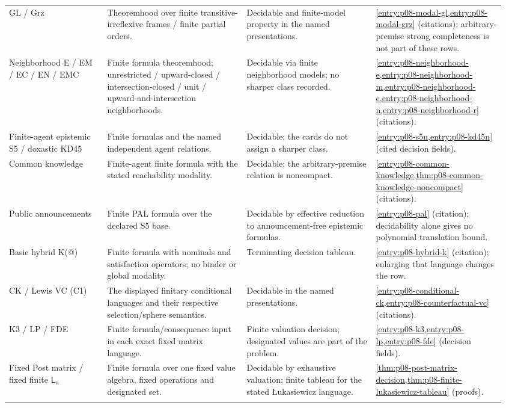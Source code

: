 \begin{landscape}
\begin{longtable}{@{}p{0.19\linewidth}p{0.27\linewidth}p{0.25\linewidth}p{0.25\linewidth}@{}}
GL / Grz & Theoremhood over finite transitive-irreflexive frames / finite partial orders. & Decidable and finite-model property in the named presentations. & \cref{entry:p08-modal-gl,entry:p08-modal-grz} (citations); arbitrary-premise strong completeness is not part of these rows.\\\addlinespace
Neighborhood E / EM / EC / EN / EMC & Finite formula theoremhood; unrestricted / upward-closed / intersection-closed / unit / upward-and-intersection neighborhoods. & Decidable via finite neighborhood models; no sharper class recorded. & \cref{entry:p08-neighborhood-e,entry:p08-neighborhood-m,entry:p08-neighborhood-c,entry:p08-neighborhood-n,entry:p08-neighborhood-r} (citations).\\\addlinespace
Finite-agent epistemic S5 / doxastic KD45 & Finite formulas and the named independent agent relations. & Decidable; the cards do not assign a sharper class. & \cref{entry:p08-s5n,entry:p08-kd45n} (cited decision fields).\\\addlinespace
Common knowledge & Finite-agent finite formula with the stated reachability modality. & Decidable; the arbitrary-premise relation is noncompact. & \cref{entry:p08-common-knowledge,thm:p08-common-knowledge-noncompact} (citations).\\\addlinespace
Public announcements & Finite PAL formula over the declared S5 base. & Decidable by effective reduction to announcement-free epistemic formulas. & \cref{entry:p08-pal} (citation); decidability alone gives no polynomial translation bound.\\\addlinespace
Basic hybrid K(@) & Finite formula with nominals and satisfaction operators; no binder or global modality. & Terminating decision tableau. & \cref{entry:p08-hybrid-k} (citation); enlarging that language changes the row.\\\addlinespace
CK / Lewis VC (C1) & The displayed finitary conditional languages and their respective selection/sphere semantics. & Decidable in the named presentations. & \cref{entry:p08-conditional-ck,entry:p08-counterfactual-vc} (citations).\\\addlinespace
K3 / LP / FDE & Finite formula/consequence input in each exact fixed matrix language. & Finite valuation decision; designated values are part of the problem. & \cref{entry:p08-k3,entry:p08-lp,entry:p08-fde} (decision fields).\\\addlinespace
Fixed Post matrix / fixed finite \(\mathsf L_n\) & Finite formula over one fixed value algebra, fixed operations and designated set. & Decidable by exhaustive valuation; finite tableau for the stated \L{}ukasiewicz language. & \cref{thm:p08-post-matrix-decision,thm:p08-finite-lukasiewicz-tableau} (proofs).\\\addlinespace

\end{longtable}
\end{landscape}
